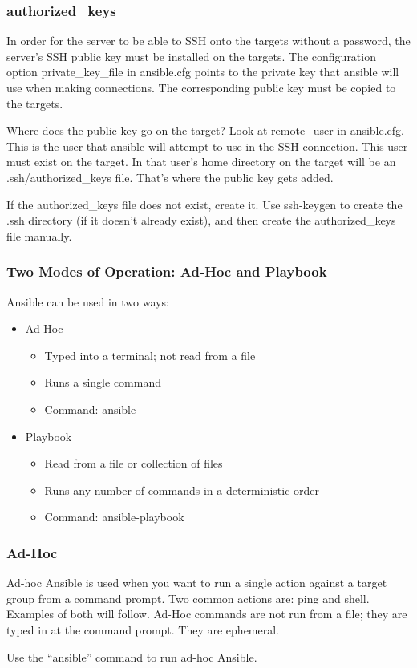 \documentclass[helvetica,english,utf8,notitle,nologo]{beamer}
\begin{document}
\begin{frame}
  \frametitle{authorized\_keys}

  In order for the server to be able to SSH onto the targets without a
  password, the server's SSH public key must be installed on the
  targets. The configuration option private\_key\_file in ansible.cfg
  points to the private key that ansible will use when making
  connections. The corresponding public key must be copied to the
  targets.

  Where does the public key go on the target? Look at remote\_user in
  ansible.cfg. This is the user that ansible will attempt to use in
  the SSH connection. This user must exist on the target. In that
  user's home directory on the target will be an .ssh/authorized\_keys
  file. That's where the public key gets added.

  If the authorized\_keys file does not exist, create it. Use
  ssh-keygen to create the .ssh directory (if it doesn't already
  exist), and then create the authorized\_keys file manually.
\end{frame}

\begin{frame}
  \frametitle{Two Modes of Operation: Ad-Hoc and Playbook}

  Ansible can be used in two ways:

  \begin{itemize}
  \item Ad-Hoc
    \begin{itemize}
    \item Typed into a terminal; not read from a file
    \item Runs a single command
    \item Command: ansible
    \end{itemize}
  \item Playbook
    \begin{itemize}
    \item Read from a file or collection of files
    \item Runs any number of commands in a deterministic order
    \item Command: ansible-playbook
    \end{itemize}
  \end{itemize}
\end{frame}

\begin{frame}
  \frametitle{Ad-Hoc}

  Ad-hoc Ansible is used when you want to run a single action against
  a target group from a command prompt. Two common actions are: ping
  and shell. Examples of both will follow. Ad-Hoc commands are not run
  from a file; they are typed in at the command prompt. They are
  ephemeral.

  Use the ``ansible'' command to run ad-hoc Ansible.
\end{frame}
\end{document}
